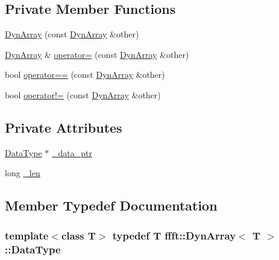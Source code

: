 \subsection*{Private Member Functions}
\begin{DoxyCompactItemize}
\item 
\hyperlink{classffft_1_1DynArray_a7d28eb73cf75f2c669a32dde120eb2cb}{Dyn\+Array} (const \hyperlink{classffft_1_1DynArray}{Dyn\+Array} \&other)
\item 
\hyperlink{classffft_1_1DynArray}{Dyn\+Array} \& \hyperlink{classffft_1_1DynArray_ab16be271312566a8ba4d2867ae2a1e5e}{operator=} (const \hyperlink{classffft_1_1DynArray}{Dyn\+Array} \&other)
\item 
bool \hyperlink{classffft_1_1DynArray_a7418a4e9990dc57b076ed5b21b1483a0}{operator==} (const \hyperlink{classffft_1_1DynArray}{Dyn\+Array} \&other)
\item 
bool \hyperlink{classffft_1_1DynArray_afe1e0c664bde31b145b3782817e355fd}{operator!=} (const \hyperlink{classffft_1_1DynArray}{Dyn\+Array} \&other)
\end{DoxyCompactItemize}
\subsection*{Private Attributes}
\begin{DoxyCompactItemize}
\item 
\hyperlink{classffft_1_1DynArray_aa21fa88c73e511acb18a7e778190ab02}{Data\+Type} $\ast$ \hyperlink{classffft_1_1DynArray_acfb894fb97f7a2aed0e5c242bb82073a}{\+\_\+data\+\_\+ptr}
\item 
long \hyperlink{classffft_1_1DynArray_ab598085ccf8352effe43635aec134cb6}{\+\_\+len}
\end{DoxyCompactItemize}


\subsection{Member Typedef Documentation}
\subsubsection[{\texorpdfstring{Data\+Type}{DataType}}]{\setlength{\rightskip}{0pt plus 5cm}template$<$class T$>$ typedef T {\bf ffft\+::\+Dyn\+Array}$<$ T $>$\+::{\bf Data\+Type}}\hypertarget{classffft_1_1DynArray_aa21fa88c73e511acb18a7e778190ab02}{}\label{classffft_1_1DynArray_aa21fa88c73e511acb18a7e778190ab02}



